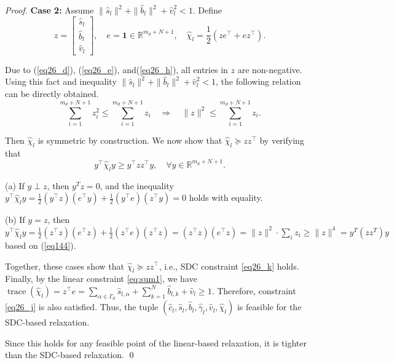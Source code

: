 \documentclass[10pt,a4paper]{amsart}
\begin{document}
\begin{proof}
\textbf{Case 2:} Assume $\|\hat{s}_l\|^2 + \|\hat{b}_l\|^2 + \hat{v}_l^2 < 1$. Define
\begin{equation} \label{eq143}
z = \begin{bmatrix}
\hat{s}_l \\
\hat{b}_l \\
\hat{v}_l
\end{bmatrix}, \quad
e = \mathbf{1} \in \mathbb{R}^{m_d + N + 1}, \quad
\hat{\chi}_l = \frac{1}{2}(z e^\top + e z^\top).
\end{equation}

Due to (\ref{eq26_d}), (\ref{eq26_e}), and(\ref{eq26_h}), all entries in $z$ are non-negative. Using this fact and inequality $\|\hat{s}_l\|^2 + \|\hat{b}_l\|^2 + \hat{v}_l^2 < 1$, the following relation can be directly obtained.
\begin{equation} \label{eq144}
\sum_{i=1}^{m_d+N+1} z_i^2 \le \sum_{i=1}^{m_d+N+1} z_i \quad \Rightarrow \quad \|z\|^2 \le \sum_{i=1}^{m_d+N+1} z_i.    
\end{equation}

Then $\hat{\chi}_l$ is symmetric by construction. We now show that $\hat{\chi}_l \succeq zz^\top$ by verifying that
\begin{equation}
y^\top \hat{\chi}_l y \ge y^\top zz^\top y, \quad \forall y \in \mathbb{R}^{m_d + N + 1}.
\end{equation}

(a) If $y \perp z$, then $y^T z = 0$, and the inequality
$y^\top \hat{\chi}_l y = \frac{1}{2}(y^\top z)(e^\top y) + \frac{1}{2}(y^\top e)(z^\top y) = 0$  holds with equality.

(b) If $y = z$, then $y^\top \hat{\chi}_l y = \frac{1}{2}(z^\top z)(e^\top z) + \frac{1}{2}(z^\top e)(z^\top z) = (z^\top z)(e^\top z) = \|z\|^2 \cdot \sum_i z_i\ge \|z\|^4=y^T(zz^T)y$ based on (\ref{eq144}). 

Together, these cases show that $\hat{\chi}_l \succeq zz^\top$, i.e., SDC constraint \eqref{eq26_k} holds. Finally, by the linear constraint \eqref{eq:sum1}, we have $\operatorname{trace}(\hat{\chi}_l) = z^\top e = \sum_{\alpha \in \Gamma_d} \hat{s}_{l,\alpha} + \sum_{k=1}^N \hat{b}_{l,k} + \hat{v}_l \ge 1
$. Therefore, constraint \eqref{eq26_j} is also satisfied. Thus, the tuple $\left(\hat{c}_l, \hat{s}_l, \hat{b}_l, \hat{\gamma}_l, \hat{v}_l, \hat{\chi}_l\right)$ is feasible for the SDC-based relaxation. 

Since this holds for any feasible point of the linear-based relaxation, it is tighter than the SDC-based relaxation. \qed
\end{proof}
\end{document}

